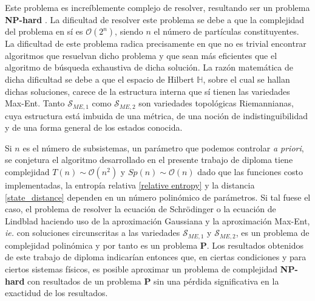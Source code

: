\documentclass{report} %
\numberwithin{equation}{section}
\begin{document}
Este problema es increíblemente complejo de resolver, resultando ser un problema \textbf{NP-hard} \cite{bolotin2013computational, bolotin2014computational}. La dificultad de resolver este problema se debe a que la complejidad del problema en sí es $\mathcal{O}(2^n)$, siendo $n$ el número de partículas constituyentes. La dificultad de este problema radica precisamente en que no es trivial encontrar algoritmos que resuelvan dicho problema y que sean más eficientes que el algoritmo de búsqueda exhaustiva \cite{Nielsen.00} de dicha solución. La razón matemática de dicha dificultad se debe a que el espacio de Hilbert $\mathds{H}$, sobre el cual se hallan dichas soluciones, carece de la estructura interna que sí tienen las variedades Max-Ent. Tanto $\mathcal{S}_{ME,1}$ como $\mathcal{S}_{ME,2}$ son variedades topológicas Riemannianas, cuya estructura está imbuida de una métrica, de una noción de indistinguibilidad y de una forma general de los estados conocida. 

Si $n$ es el número de subsistemas, un parámetro que podemos controlar \textit{a priori}, se conjetura el algoritmo desarrollado en el presente trabajo de diploma tiene complejidad $T(n) \sim \mathcal{O}(n^2)$ y $Sp(n) \sim \mathcal{O}(n)$ dado que las funciones costo implementadas, la entropía relativa \eqref{relative entropy} y la distancia \eqref{state_distance} dependen en un número polinómico de parámetros. Si tal fuese el caso, el problema de resolver la ecuación de Schrödinger o la ecuación de Lindblad haciendo uso de la aproximación Gaussiana y la aproximación Max-Ent, \textit{ie.} con soluciones circunscritas a las variedades $\mathcal{S}_{ME,1}$ y $\mathcal{S}_{ME,2}$, es un problema de complejidad polinómica y por tanto es un problema $\mathbf{P}$. Los resultados obtenidos de este trabajo de diploma indicarían entonces que, en ciertas condiciones y para ciertos sistemas físicos, es posible aproximar un problema de complejidad \textbf{NP-hard} con resultados de un problema \textbf{P} sin una pérdida significativa en la exactidud de los resultados.










\end{document}

